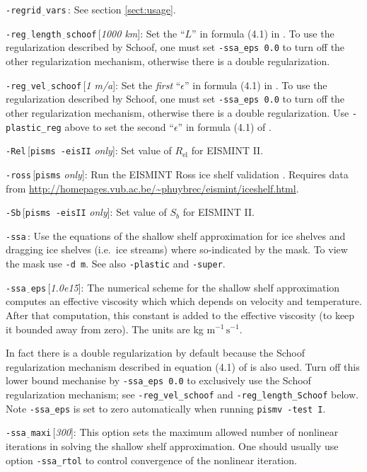 \documentclass[11pt,final]{amsart}
\newcommand{\eps}{\epsilon}
\newcommand{\rawopt}[1]{\vspace{1mm}\noindent \large\texttt{-#1}\normalsize}
\newcommand{\opt}[1]{\rawopt{#1}\,:\quad}
\newcommand{\optdef}[2]{\rawopt{#1}\,[\textsl{#2}]:\quad}
\newcommand{\optrestrict}[2]{\rawopt{#1}\,[\texttt{#2} \textsl{only}]:\quad}
\newcommand{\und}{$\underline{\,\,\,}$}
\begin{document}
\opt{regrid\und vars}  See section \ref{sect:usage}.

\optdef{reg\und length\und schoof}{1000 km}  Set the ``$L$'' in formula (4.1) in \cite{SchoofStream}.  To use the regularization described by Schoof, one must set \verb|-ssa_eps 0.0| to turn off the other regularization mechanism, otherwise there is a double regularization.

\optdef{reg\und vel\und schoof}{1 m/a}  Set the \emph{first} ``$\eps$'' in formula (4.1) in \cite{SchoofStream}.  To use the regularization described by Schoof, one must set \verb|-ssa_eps 0.0| to turn off the other regularization mechanism, otherwise there is a double regularization.  Use \verb|-plastic_reg| above to set the second ``$\eps$'' in formula (4.1) of \cite{SchoofStream}.

\optrestrict{Rel}{pisms -eisII}    Set value of $R_{\text{el}}$ for EISMINT II.

\optrestrict{ross}{pisms}    Run the EISMINT Ross ice shelf validation \cite{MacAyealetal}.  Requires data from \url{http://homepages.vub.ac.be/~phuybrec/eismint/iceshelf.html}.

\optrestrict{Sb}{pisms -eisII}    Set value of $S_b$ for EISMINT II.

\opt{ssa}  Use the equations of the shallow shelf approximation \cite{MacAyeal,Morland,SchoofStream,WeisGreveHutter} for ice shelves and dragging ice shelves (i.e.~ice streams) where so-indicated by the mask.  To view the mask use \verb|-d m|.  See also \verb|-plastic| and \verb|-super|.

\optdef{ssa\und eps}{1.0e15}  The numerical scheme for the shallow shelf approximation  \cite{WeisGreveHutter} computes an effective viscosity which which depends on velocity and temperature.  After that computation, this constant is added to the effective viscosity (to keep it bounded away from zero).  The units are kg $\text{m}^{-1}\,\text{s}^{-1}$. 

In fact there is a double regularization by default because the Schoof regularization mechanism described in equation (4.1) of \cite{SchoofStream} is also used.  Turn off this lower bound mechanise by \verb|-ssa_eps 0.0| to exclusively use the Schoof regularization mechanism; see \verb|-reg_vel_schoof| and \verb|-reg_length_Schoof| below.  Note \verb|-ssa_eps| is set to zero automatically when running \verb|pismv -test I|.

\optdef{ssa\und maxi}{300}  This option sets the maximum allowed number of nonlinear iterations in solving the shallow shelf approximation.  One should usually use option \verb|-ssa_rtol| to control convergence of the nonlinear iteration.
\end{document}

